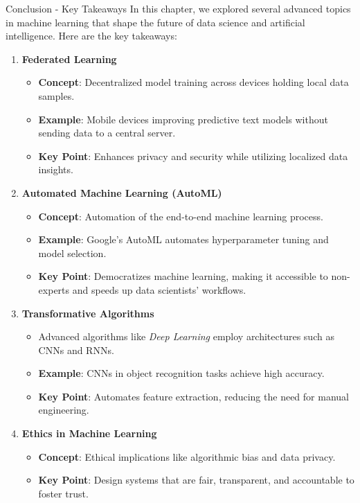 \documentclass[aspectratio=169]{beamer}
\begin{document}
\begin{frame}[fragile]{Conclusion - Key Takeaways}
    In this chapter, we explored several advanced topics in machine learning that shape the future of data science and artificial intelligence. Here are the key takeaways:

    \begin{enumerate}
        \item \textbf{Federated Learning}
            \begin{itemize}
                \item \textbf{Concept}: Decentralized model training across devices holding local data samples.
                \item \textbf{Example}: Mobile devices improving predictive text models without sending data to a central server.
                \item \textbf{Key Point}: Enhances privacy and security while utilizing localized data insights.
            \end{itemize}
            
        \item \textbf{Automated Machine Learning (AutoML)}
            \begin{itemize}
                \item \textbf{Concept}: Automation of the end-to-end machine learning process.
                \item \textbf{Example}: Google's AutoML automates hyperparameter tuning and model selection.
                \item \textbf{Key Point}: Democratizes machine learning, making it accessible to non-experts and speeds up data scientists' workflows.
            \end{itemize}

        \item \textbf{Transformative Algorithms}
            \begin{itemize}
                \item Advanced algorithms like \textit{Deep Learning} employ architectures such as CNNs and RNNs.
                \item \textbf{Example}: CNNs in object recognition tasks achieve high accuracy.
                \item \textbf{Key Point}: Automates feature extraction, reducing the need for manual engineering.
            \end{itemize}

        \item \textbf{Ethics in Machine Learning}
            \begin{itemize}
                \item \textbf{Concept}: Ethical implications like algorithmic bias and data privacy.
                \item \textbf{Key Point}: Design systems that are fair, transparent, and accountable to foster trust.
            \end{itemize}
    \end{enumerate}
\end{frame}
\end{document}
